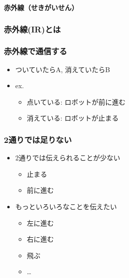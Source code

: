 \begin{frame}[plain]
    \begin{center}
        \vspace{48pt}
        {\huge\bf 赤外線（せきがいせん）}
    \end{center}
\end{frame}

\begin{frame}[fragile]
    \frametitle{赤外線(IR)とは}
    \vspace{20pt}
    \begin{center}
        
    \end{center}
\end{frame}

\begin{frame}
    \frametitle{赤外線で通信する}
    \begin{itemize}
        \item ついていたらA, 消えていたらB
        \item ex.
        \begin{itemize}
            \item 点いている: ロボットが前に進む
            \item 消えている: ロボットが止まる
        \end{itemize}
    \end{itemize}
\end{frame}

\begin{frame}
   \frametitle{2通りでは足りない} 
   \begin{itemize}
        \item 2通りでは伝えられることが少ない
        \begin{itemize}
            \item 止まる
            \item 前に進む
        \end{itemize}
        \item もっといろいろなことを伝えたい
        \begin{itemize}
            \item 左に進む
            \item 右に進む
            \item 飛ぶ
            \item \dots
        \end{itemize}
   \end{itemize}
\end{frame}


